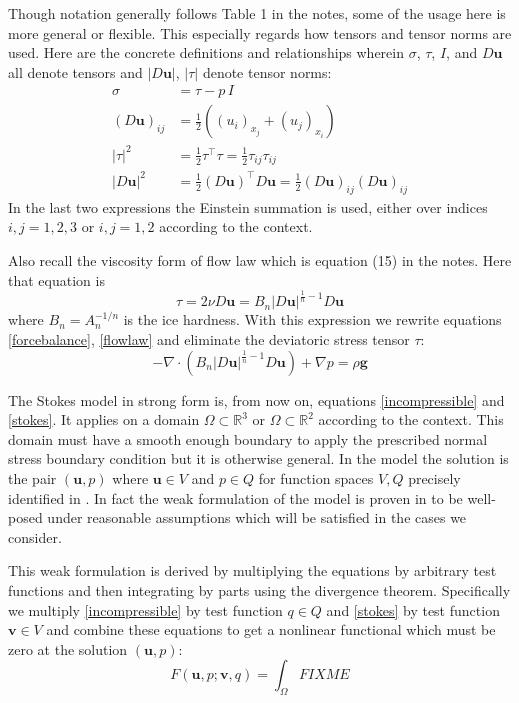 \documentclass[letterpaper,final,12pt,reqno]{amsart}
\newcommand{\RR}{\mathbb{R}}
\newcommand{\bu}{\mathbf{u}}
\newcommand{\bv}{\mathbf{v}}
\begin{document}
Though notation generally follows Table 1 in the notes, some of the usage here is more general or flexible.  This especially regards how tensors and tensor norms are used.  Here are the concrete definitions and relationships wherein $\sigma$, $\tau$, $I$, and $D\bu$ all denote tensors and $|D\bu|$, $|\tau|$ denote tensor norms:
\begin{align*}
\sigma &= \tau - p\,I \\
(D\bu)_{ij} &= \frac{1}{2} \left((u_i)_{x_j} + (u_j)_{x_i}\right) \\
|\tau|^2 &= \frac{1}{2} \tau^\top \tau = \frac{1}{2} \tau_{ij} \tau_{ij} \\
|D\bu|^2 &= \frac{1}{2} (D\bu)^\top D\bu = \frac{1}{2} (D\bu)_{ij} (D\bu)_{ij}
\end{align*}
In the last two expressions the Einstein summation is used, either over indices $i,j=1,2,3$ or $i,j=1,2$ according to the context.

Also recall the viscosity form of flow law which is equation (15) in the notes.  Here that equation is
\begin{equation}
\tau = 2\nu D\bu = B_n |D\bu|^{\frac{1}{n} - 1} D\bu  \label{viscflowlaw}
\end{equation}
where $B_n = A_n^{-1/n}$ is the ice hardness.  With this expression we rewrite equations \eqref{forcebalance}, \eqref{flowlaw} and eliminate the deviatoric stress tensor $\tau$:
\begin{equation}
- \nabla \cdot \left(B_n |D\bu|^{\frac{1}{n} - 1} D\bu\right) + \nabla p = \rho \mathbf{g} \label{stokes}
\end{equation}

The Stokes model in strong form is, from now on, equations \eqref{incompressible} and \eqref{stokes}.  It applies on a domain $\Omega\subset \RR^3$ or $\Omega \subset \RR^2$ according to the context.  This domain must have a smooth enough boundary to apply the prescribed normal stress boundary condition but it is otherwise general.  In the model the solution is the pair $(\bu,p)$ where $\bu\in V$ and $p \in Q$ for function spaces $V,Q$ precisely identified in \cite{JouvetRappaz2011}.  In fact the weak formulation of the model is proven in \cite{JouvetRappaz2011} to be well-posed under reasonable assumptions which will be satisfied in the cases we consider.

This weak formulation is derived by multiplying the equations by arbitrary test functions and then integrating by parts using the divergence theorem.  Specifically we multiply \eqref{incompressible} by test function $q\in Q$ and \eqref{stokes} by test function $\bv\in V$ and combine these equations to get a nonlinear functional which must be zero at the solution $(\bu,p)$:
\begin{equation}
F(\bu,p;\bv,q) = \int_\Omega FIXME
\end{equation}
\end{document}
